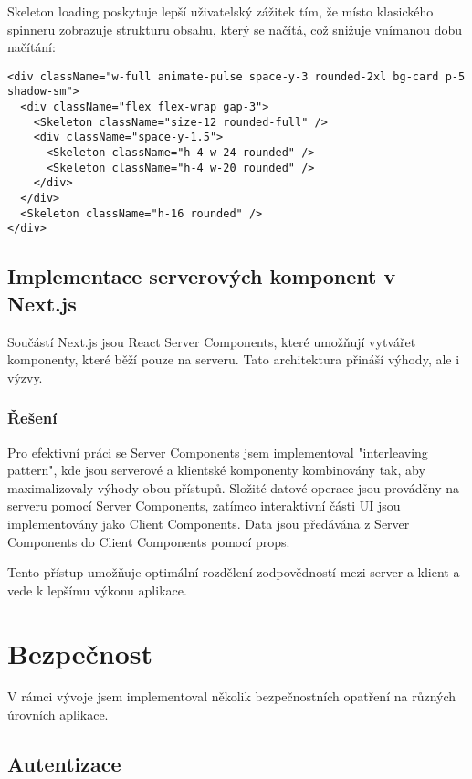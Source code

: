 \documentclass[12pt]{article}
\begin{document}
Skeleton loading poskytuje lepší uživatelský zážitek tím, že místo klasického spinneru zobrazuje strukturu obsahu, který se načítá, což snižuje vnímanou dobu načítání:

\begin{lstlisting}[style=typescript]
<div className="w-full animate-pulse space-y-3 rounded-2xl bg-card p-5 shadow-sm">
  <div className="flex flex-wrap gap-3">
    <Skeleton className="size-12 rounded-full" />
    <div className="space-y-1.5">
      <Skeleton className="h-4 w-24 rounded" />
      <Skeleton className="h-4 w-20 rounded" />
    </div>
  </div>
  <Skeleton className="h-16 rounded" />
</div>
\end{lstlisting}

\subsection{Implementace serverových komponent v Next.js}

Součástí Next.js jsou React Server Components, které umožňují vytvářet komponenty, které běží pouze na serveru. Tato architektura přináší výhody, ale i výzvy.

\subsubsection{Řešení}

Pro efektivní práci se Server Components jsem implementoval "interleaving pattern", kde jsou serverové a klientské komponenty kombinovány tak, aby maximalizovaly výhody obou přístupů. Složité datové operace jsou prováděny na serveru pomocí Server Components, zatímco interaktivní části UI jsou implementovány jako Client Components. Data jsou předávána z Server Components do Client Components pomocí props.

Tento přístup umožňuje optimální rozdělení zodpovědností mezi server a klient a vede k lepšímu výkonu aplikace.

\newpage
\section{Bezpečnost}

V rámci vývoje jsem implementoval několik bezpečnostních opatření na různých úrovních aplikace.

\subsection{Autentizace}
\end{document}
